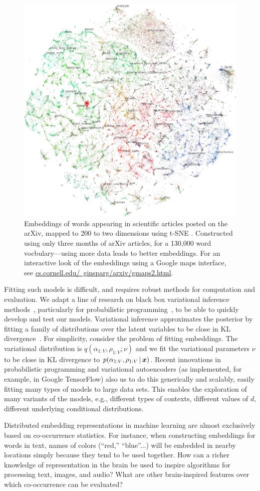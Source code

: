 \setlength{\columnsep}{20pt}
\begin{figure}
\centering
\includegraphics[width=.44\textwidth]{figs/ginsparg}
\caption{\small Embeddings of words appearing in scientific articles
posted on the arXiv, mapped to 200 to two dimensions using
t-SNE \citep{ginsparg}. Constructed using only three months of
arXiv articles, for a 130,000 word vocbulary---using more data
leads to better embeddings.
For an interactive look of the embeddings
using a Google maps interface, see \href{http://www.cs.cornell.edu/~ginsparg/arxiv/gmaps2.html}{cs.cornell.edu/~ginsparg/arxiv/gmaps2.html}.
}
    \label{fig:arxiv}
    \vskip2pt
\end{figure}

Fitting such models is
difficult, and requires robust methods for computation and
evaluation.  We adapt a line of research on black
box variational inference methods~\citep{Ranganath:2014}, particularly
for probabilistic programming~\citep{Kucukelbir:2017,Tran:2017}, 
to be able to quickly develop and test our models.
Variational inference approximates the posterior by fitting a family
of distributions over the latent variables to be close in KL
divergence~\citep{Jordan:1999,Blei:2017}.  For simplicity, consider
the problem of fitting embeddings.  The variational
distribution is $q(\alpha_{1:V}, \rho_{1:V} ; \nu)$ and we fit the
variational parameters $\nu$ to be close in KL divergence to
$p(\alpha_{1:V}, \rho_{1:V} \,\vert\, \boldsymbol{x})$.  Recent innovations in
probabilistic programming and variational autoencoders
\citep{kingma} (as implemented, for example, in Google TensorFlow) also us to do this generically and
scalably, easily fitting many types of models to large
data sets.  This enables the exploration of many variants of the
models, e.g., different types of contexts, different values of $d$,
different underlying conditional distributions.


Distributed embedding representations in machine learning are almost
exclusively based on co-occurrence statistics. For instance, when
constructing embeddings for words in text, names of colors (``red,''
``blue''...) will be embedded in nearby locations simply because they
tend to be used together. How can a richer knowledge of representation
in the brain be used to inspire algorithms for processing text,
images, and audio? What are other brain-inspired features over which
co-occurrence can be evaluated?

